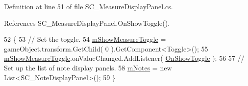 Definition at line 51 of file S\+C\+\_\+\+Measure\+Display\+Panel.\+cs.



References S\+C\+\_\+\+Measure\+Display\+Panel.\+On\+Show\+Toggle().


\begin{DoxyCode}
52     \{
53         \textcolor{comment}{// Set the toggle.}
54         \hyperlink{group___s_c___m_d_p_priv_var_gabec551ab0b79d269b028f4bc99e82b00}{mShowMeasureToggle} = gameObject.transform.GetChild( 0 ).GetComponent<Toggle>();
55         \hyperlink{group___s_c___m_d_p_priv_var_gabec551ab0b79d269b028f4bc99e82b00}{mShowMeasureToggle}.onValueChanged.AddListener( 
      \hyperlink{group___s_c___m_d_p_handlers_ga31c72fee5ddd5ae7b057b2f265341263}{OnShowToggle} );
56 
57         \textcolor{comment}{// Set up the list of note display panels.}
58         \hyperlink{group___s_c___m_d_p_priv_var_gaf8a533bce87e58d8f7a1da88f476ac6f}{mNotes} = \textcolor{keyword}{new} List<SC\_NoteDisplayPanel>();
59     \}
\end{DoxyCode}
